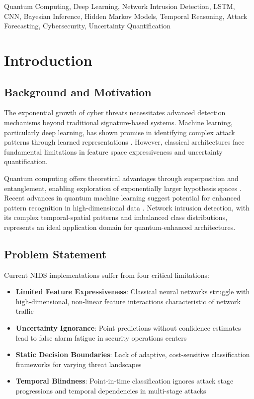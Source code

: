 \documentclass[conference]{IEEEtran}
\begin{document}
\begin{IEEEkeywords}
Quantum Computing, Deep Learning, Network Intrusion Detection, LSTM, CNN, Bayesian Inference, Hidden Markov Models, Temporal Reasoning, Attack Forecasting, Cybersecurity, Uncertainty Quantification
\end{IEEEkeywords}

\section{Introduction}
\subsection{Background and Motivation}
The exponential growth of cyber threats necessitates advanced detection mechanisms beyond traditional signature-based systems. Machine learning, particularly deep learning, has shown promise in identifying complex attack patterns through learned representations \cite{ref1}. However, classical architectures face fundamental limitations in feature space expressiveness and uncertainty quantification.

Quantum computing offers theoretical advantages through superposition and entanglement, enabling exploration of exponentially larger hypothesis spaces \cite{ref2}. Recent advances in quantum machine learning suggest potential for enhanced pattern recognition in high-dimensional data \cite{ref3}. Network intrusion detection, with its complex temporal-spatial patterns and imbalanced class distributions, represents an ideal application domain for quantum-enhanced architectures.

\subsection{Problem Statement}
Current NIDS implementations suffer from four critical limitations:
\begin{itemize}
    \item \textbf{Limited Feature Expressiveness}: Classical neural networks struggle with high-dimensional, non-linear feature interactions characteristic of network traffic
    \item \textbf{Uncertainty Ignorance}: Point predictions without confidence estimates lead to false alarm fatigue in security operations centers
    \item \textbf{Static Decision Boundaries}: Lack of adaptive, cost-sensitive classification frameworks for varying threat landscapes
    \item \textbf{Temporal Blindness}: Point-in-time classification ignores attack stage progressions and temporal dependencies in multi-stage attacks
\end{itemize}
\end{document}

